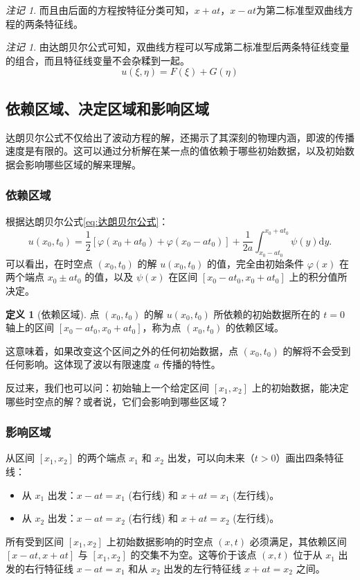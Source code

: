 \documentclass[12pt,a4paper]{article}
\numberwithin{subsection}{section}
\numberwithin{subsubsection}{subsection}
\theoremstyle{plain}
\theoremstyle{definition}
\newtheorem{definition}[theorem]{定义}
\theoremstyle{remark}
\newtheorem{remark}[theorem]{注记}
\begin{document}
	\begin{remark}
		而且由后面的方程按特征分类可知，$x + a t$，$x - a t$为第二标准型双曲线方程的两条特征线。
	\end{remark}
	\begin{remark}
	由达朗贝尔公式可知，双曲线方程可以写成第二标准型后两条特征线变量的组合，而且特征线变量不会杂糅到一起。
	\[
	u(\xi, \eta) = F(\xi) + G(\eta)
	\]
\end{remark}

	\subsection{依赖区域、决定区域和影响区域}
	达朗贝尔公式不仅给出了波动方程的解，还揭示了其深刻的物理内涵，即波的传播速度是有限的。这可以通过分析解在某一点的值依赖于哪些初始数据，以及初始数据会影响哪些区域的解来理解。
	
		\subsubsection{依赖区域 }
	根据达朗贝尔公式\eqref{eq:达朗贝尔公式}：
	\[
	u(x_0, t_0) = \frac{1}{2} \left[ \varphi(x_0 + a t_0) + \varphi(x_0 - a t_0) \right] + \frac{1}{2 a} \int_{x_0 - a t_0}^{x_0 + a t_0} \psi(y) \mathrm{d}y.
	\]
	可以看出，在时空点 \((x_0, t_0)\) 的解 \(u(x_0, t_0)\) 的值，完全由初始条件 \(\varphi(x)\) 在两个端点 \(x_0 \pm at_0\) 的值，以及 \(\psi(x)\) 在区间 \([x_0 - at_0, x_0 + at_0]\) 上的积分值所决定。
	
	\begin{definition}[依赖区域]
		点 \((x_0, t_0)\) 的解 \(u(x_0, t_0)\) 所依赖的初始数据所在的 \(t=0\) 轴上的区间 \([x_0 - at_0, x_0 + at_0]\)，称为点 \((x_0, t_0)\) 的依赖区域。
	\end{definition}
	
	这意味着，如果改变这个区间之外的任何初始数据，点 \((x_0, t_0)\) 的解将不会受到任何影响。这体现了波以有限速度 \(a\) 传播的特性。
	
	反过来，我们也可以问：初始轴上一个给定区间 \([x_1, x_2]\) 上的初始数据，能决定哪些时空点的解？或者说，它们会影响到哪些区域？
	


\subsubsection{影响区域 }
从区间 \([x_1, x_2]\) 的两个端点 \(x_1\) 和 \(x_2\) 出发，可以向未来（\(t>0\)）画出四条特征线：
\begin{itemize}
	\item 从 \(x_1\) 出发：\(x - at = x_1\) (右行线) 和 \(x + at = x_1\) (左行线)。
	\item 从 \(x_2\) 出发：\(x - at = x_2\) (右行线) 和 \(x + at = x_2\) (左行线)。
\end{itemize}
所有受到区间 \([x_1, x_2]\) 上初始数据影响的时空点 \((x,t)\) 必须满足，其依赖区间 \([x-at, x+at]\) 与 \([x_1, x_2]\) 的交集不为空。这等价于该点 \((x,t)\) 位于从 \(x_1\) 出发的右行特征线 \(x-at=x_1\) 和从 \(x_2\) 出发的左行特征线 \(x+at=x_2\) 之间。
\end{document}
